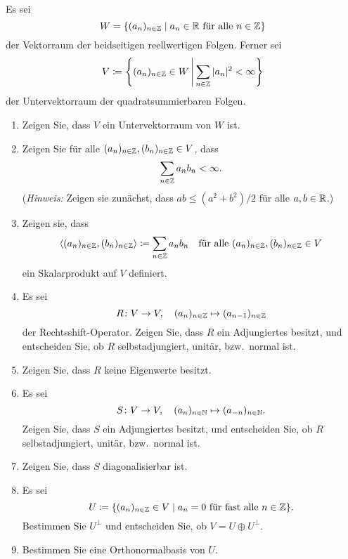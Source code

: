 \documentclass[a4paper,10pt]{article}
\begin{document}
\begin{question}
  Es sei
  \[
    W = \{(a_n)_{n \in \mathbb{Z}} \mid \text{$a_n \in \mathbb{R}$ für alle $n \in \mathbb{Z}$}\}
  \]
  der Vektorraum der beidseitigen reellwertigen Folgen.
  Ferner sei
  \[
    V \coloneqq
    \left\{
      (a_n)_{n \in \mathbb{Z}} \in W
    \,\middle|\,
      \sum_{n \in \mathbb{Z}} |a_n|^2 < \infty
   \right\}
  \]
  der Untervektorraum der quadratsummierbaren Folgen.
  \begin{enumerate}[leftmargin=*]
    \item
      Zeigen Sie, dass $V$ ein Untervektorraum von $W$ ist.
    \item
      Zeigen Sie für alle $(a_n)_{n \in \mathbb{Z}}, (b_n)_{n \in \mathbb{Z}} \in V$, dass
      \[
        \sum_{n \in \mathbb{Z}} a_n b_n < \infty.
      \]
      (\emph{Hinweis:} Zeigen sie zunächst, dass $ab \leq (a^2 + b^2)/2$ für alle $a, b \in \mathbb{R}$.)
    \item
      Zeigen sie, dass
      \[
                  \langle  (a_n)_{n \in \mathbb{Z}}, (b_n)_{n \in \mathbb{Z}}  \rangle
        \coloneqq \sum_{n \in \mathbb{Z}} a_n b_n
        \quad
        \text{für alle $(a_n)_{n \in \mathbb{Z}}, (b_n)_{n \in \mathbb{Z}} \in V$}
      \]
      ein Skalarprodukt auf $V$ definiert.
    \item
      Es sei
      \[
        R \colon V \to V,
        \quad
        (a_n)_{n \in \mathbb{Z}} \mapsto (a_{n-1})_{n \in \mathbb{Z}}
      \]
      der Rechtsshift-Operator.
      Zeigen Sie, dass $R$ ein Adjungiertes besitzt, und entscheiden Sie, ob $R$ selbstadjungiert, unitär, bzw.\ normal ist.
    \item
      Zeigen Sie, dass $R$ keine Eigenwerte besitzt.
    \item
      Es sei
      \[
        S \colon V \to V,
        \quad
        (a_n)_{n \in \mathbb{N}} \mapsto (a_{-n})_{n \in \mathbb{N}}.
      \]
      Zeigen Sie, dass $S$ ein Adjungiertes besitzt, und entscheiden Sie, ob $R$ selbstadjungiert, unitär, bzw.\ normal ist.
    \item
      Zeigen Sie, dass $S$ diagonalisierbar ist.
    \item
      Es sei
      \[
        U \coloneqq \{(a_n)_{n \in \mathbb{Z}} \in V \mid \text{$a_n = 0$ für fast alle $n \in \mathbb{Z}$}\}.
      \]
      Bestimmen Sie $U^\perp$ und entscheiden Sie, ob $V = U \oplus U^\perp$.
    \item
      Bestimmen Sie eine Orthonormalbasis von $U$.
  \end{enumerate}
\end{question}
\end{document}

